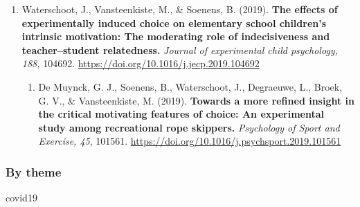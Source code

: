 \documentclass[
  twocolumn]{article}
\providecommand{\tightlist}{%
  \setlength{\itemsep}{0pt}\setlength{\parskip}{0pt}}
\begin{document}
\begin{enumerate}
\def\labelenumi{\arabic{enumi}.}
\setcounter{enumi}{1}
\tightlist
\item
  Waterschoot, J., Vansteenkiste, M., \& Soenens, B. (2019). \textbf{The
  effects of experimentally induced choice on elementary school
  children's intrinsic motivation: The moderating role of indecisiveness
  and teacher--student relatedness.} \emph{Journal of experimental child
  psychology, 188,} 104692.
  \url{https://doi.org/10.1016/j.jecp.2019.104692}

  \begin{enumerate}
  \def\labelenumii{\arabic{enumii}.}
  \tightlist
  \item
    De Muynck, G. J., Soenens, B., Waterschoot, J., Degraeuwe, L.,
    Broek, G. V., \& Vansteenkiste, M. (2019). \textbf{Towards a more
    refined insight in the critical motivating features of choice: An
    experimental study among recreational rope skippers.}
    \emph{Psychology of Sport and Exercise, 45}, 101561.
    \url{https://doi.org/10.1016/j.psychsport.2019.101561}
  \end{enumerate}
\end{enumerate}

\hypertarget{by-theme}{%
\subsubsection{By theme}\label{by-theme}}

covid19
\end{document}
